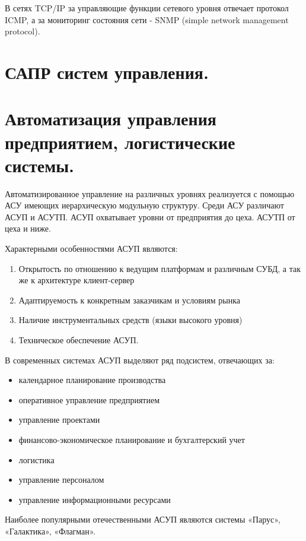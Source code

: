 \documentclass[unicode, 12pt, a4paper, oneside]{article}
\begin{document}
В сетях TCP/IP за управляющие функции сетевого уровня отвечает протокол ICMP, а за мониторинг состояния сети - SNMP (simple network management protocol).

\section{САПР систем управления.}



\section{Автоматизация управления предприятием, логистические системы.}

Автоматизированное управление на различных уровнях реализуется с помощью АСУ имеющих иерархическую модульную структуру. Среди АСУ различают АСУП и АСУТП. АСУП охватывает уровни от предприятия до цеха. АСУТП от цеха и ниже.

Характерными особенностями АСУП являются:
\begin{enumerate}
\item Открытость по отношению к ведущим платформам и различным СУБД, а так же к архитектуре клиент-сервер
\item Адаптируемость к конкретным заказчикам и условиям рынка
\item Наличие инструментальных средств (языки высокого уровня)
\item Техническое обеспечение АСУП.
\end{enumerate}

В современных системах АСУП выделяют ряд подсистем, отвечающих за:

\begin{itemize}
\item календарное планирование производства
\item оперативное управление предприятием
\item управление проектами
\item финансово-экономическое планирование и бухгалтерский учет
\item логистика
\item управление персоналом
\item управление информационными ресурсами
\end{itemize}

Наиболее популярными отечественными АСУП являются системы «Парус», «Галактика», «Флагман».
\end{document}

